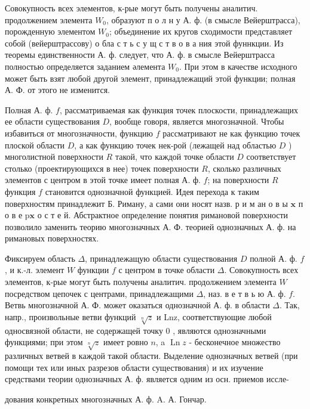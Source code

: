 \documentclass[10pt]{article}
\begin{document}
Совокупность всех элементов, к-рые могут быть получены аналитич. продолжением элемента $W_{0}$, образуют п о л н у А. ф. (в смысле Вейерштрасса), порожденную элементом $W_{0}$; объединение их кругов сходимости представляет собой (вейерштрассову) о бла с т ь с у щ с т в о в а ния этой фуннкции. Из теоремы единственности А. ф. следует, что А. ф. в смысле Вейерштрасса полностью определяется заданием әлемента $W_{0}$. При этом в качестве исходного может быть взят любой другой элемент, принадлежащий этой функции; полная А. Ф. от этого не изменится.



Полная А. ф. $f$, рассматриваемая как функция точек плоскости, принадлежащих ее области существования $D$, вообще говоря, является многозначной. Чтобы избавиться от многозначности, функцию $f$ рассматривают не как функцию точек плоской области $D$, а как функцию точек нек-рой (лежащей над областью $D$ ) многолистной поверхности $R$ такой, что каждой точке области $D$ соответствует столько (проектирующихся в нее) точек поверхности $R$, сколько различных элементов с центром в этой точке имеет полная А. ф. $f$; на поверхности $R$ функция $f$ становится однозначной функцией. Идея перехода к таким поверхностям принадлежит Б. Риману, а сами они носят назв. р и м ан о в ы $\mathbf{x}$ п о в е $\mathrm{p} \mathbf{x}$ о с т е й. Абстрактное определение понятия римановой поверхности позволило заменить теорию многозначных А. Ф. теорией однозначных А. ф. на римановых поверхностях.



Фиксируем область $\Delta$, принадлежащую области существования $D$ полной А. ф. $f$, и к.-л. элемент $W$ функции $f$ с центром в точке области $\Delta$. Совокупность всех элементов, к-рые могут быть получены аналитич. продолжением элемента $W$ посредством цепочек с центрами, принадлежащими $\Delta$, наз. в е т в ь ю А. ф. $f$. Ветвь многозначной А. Ф. может оказаться однозначной А. ф. в области $\Delta$. Так, напр., произвольные ветви функций $\sqrt[n]{z}$ и Lnz, соответствующие любой односвязной области, не содержащей точку 0 , являются однозначными функциями; при этом $\sqrt[n]{z}$ имеет ровно $n$, a $\operatorname{Ln} z$ - бесконечное множество различных ветвей в каждой такой области. Выделение однозначных ветвей (при помощи тех или иных разрезов области существования) и их изучение средствами теории однозначных А. ф. является одним из осн. приемов иссле-



дования конкретных многозначных А. ф. A. А. Гончар.
\end{document}
